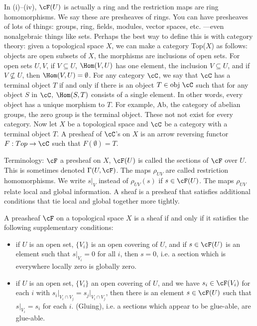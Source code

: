 \begin{rem}
In (i)--(iv), $\cF(U)$ is actually a ring and the restriction maps are ring homomorphisms. We say these are presheaves of rings. You can have presheaves of lots of things: groups, ring, fields, modules, vector spaces, etc. ---even nonalgebraic things like sets. Perhaps the best way to define this is with category theory: given a topological space $X$, we can make a category Top($X$) as follows: objects are open subsets of $X$, the morphisms are inclusions of open sets. For open sets $U,V$, if $V \subseteq U$, $\Hom(V,U)$ has one element, the inclusion $V \subseteq U$, and if $V \not\subseteq U$, then $\Hom(V,U)= \emptyset$. For any category $\cC$, we say that $\cC$ has a terminal object $T$ if and only if there is an object $T \in \text{obj } \cC$ such that for any object $S$ in $\cC$, $\Hom(S,T)$ consists of a single element. In other words, every object has a unique morphism to $T$. For example, Ab, the category of abelian groups, the zero group is the terminal object. These not not exist for every category. Now let $X$ be a topological space and $\cC$ be a category with a terminal object $T$. A presheaf of $\cC$'s on $X$ is an arrow reversing functor $F: Top \to \cC$ such that $F(\emptyset)= T$. 


Terminology: 
$\cF$ a presheaf on $X$, $\cF(U)$ is called the sections of $\cF$ over $U$. This is sometimes denoted $\Gamma(U,\cF)$. The maps $\rho_{UV}$ are called restriction homomorphisms. We write $s\big|_V$ instead of $\rho_{UV}(s)$ if $s \in \cF(U)$. The maps $\rho_{UV}$ relate local and global information. A sheaf is a presheaf that satisfies additional conditions that tie local and global together more tightly. 
\end{rem}



\begin{dfn}
A preasheaf $\cF$ on a topological space $X$ is a sheaf if and only if it satisfies the following supplementary conditions:
	\begin{itemize}
	\item if $U$ is an open set, $\{V_i\}$ is an open covering of $U$, and if $s \in \cF(U)$ is an element such that $s\big|_{V_i}= 0$ for all $i$, then $s= 0$, i.e. a section which is everywhere locally zero is globally zero.
	\item if $U$ is an open set, $\{V_i\}$ an open covering of $U$, and we have $s_i \in \cF(V_i)$ for each $i$ with $s_i\big|_{V_i \cap V_j}= s_j\big|_{V_i \cap V_j}$, then there is an element $s \in \cF(U)$ such that $s\big|_{V_i}= s_i$ for each $i$. (Gluing), i.e. a sections which appear to be glue-able, are glue-able.  
	\end{itemize}
\end{dfn}


